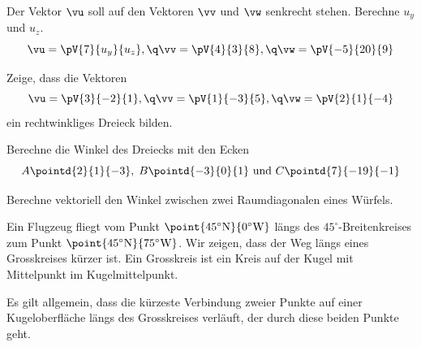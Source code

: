 \documentclass[%
11pt,%
twoside,%
titlepage,%
german,%
headsepline%
]{scrartcl}
\begin{document}
\begin{ueb}[Umkehrung]
Der Vektor $\vu$ soll auf den Vektoren $\vv$ und $\vw$ senkrecht stehen. Berechne $u_y$ und $u_z$.
$$\vu=\pV{7}{u_y}{u_z},\q\vv=\pV{4}{3}{8},\q\vw=\pV{-5}{20}{9}$$
\end{ueb}

\begin{ueb}
Zeige, dass die Vektoren
$$\vu=\pV{3}{-2}{1},\q\vv=\pV{1}{-3}{5},\q\vw=\pV{2}{1}{-4}$$
ein rechtwinkliges Dreieck bilden.
\end{ueb}

\begin{ueb}
Berechne die Winkel des Dreiecks mit den Ecken
$$A\pointd{2}{1}{-3},\; B\pointd{-3}{0}{1}\text{ und }C\pointd{7}{-19}{-1}$$
\end{ueb}

\begin{ueb}[Würfel]
Berechne vektoriell den Winkel zwischen zwei Raumdiagonalen eines Würfels.
\end{ueb}

\begin{ueb}[Geodätische]
Ein
Flugzeug fliegt vom Punkt $\point{45^{\circ}\text{N}}{0^{\circ}\text{W}}$ längs des $45^{\circ}$-Breitenkreises zum Punkt $\point{45^{\circ}\text{N}}{75^{\circ}\text{W}}$. Wir zeigen, dass der Weg längs eines Grosskreises kürzer ist. Ein Grosskreis ist ein Kreis auf der Kugel mit Mittelpunkt im Kugelmittelpunkt.
\end{ueb}

\begin{bem}
Es gilt allgemein, dass die kürzeste Verbindung zweier Punkte auf einer Kugel\-ober\-fläche längs des Grosskreises verläuft, der durch diese beiden Punkte geht.
\end{bem}
\end{document}

